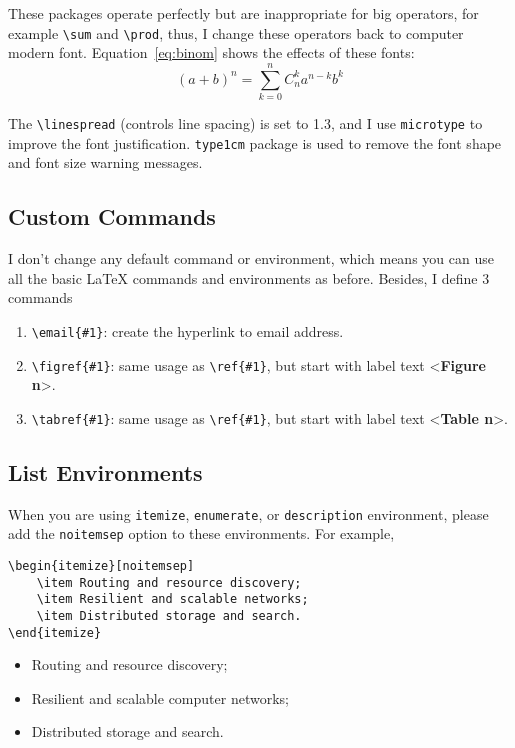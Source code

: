 \documentclass{elegantpaper}
\begin{document}
These packages operate perfectly but are inappropriate for big operators, for example \verb|\sum| and \verb|\prod|, thus, I change these operators back to computer modern font. Equation~\eqref{eq:binom} shows the effects of these fonts:
\begin{equation}
(a+b)^{n} = \sum_{k=0}^{n} C_{n}^{k} a^{n-k} b^k \label{eq:binom}
\end{equation}



The \verb|\linespread| (controls line spacing) is set to 1.3, and I use \verb|microtype| to improve the font justification. \verb|type1cm| package is used to remove the font shape and font size warning messages.

\subsection{Custom Commands}

I don't change any default command or environment, which means you can use all the basic \LaTeX{} commands and environments as before.  Besides, I define 3 commands
\begin{enumerate}[noitemsep]
	\item \verb|\email{#1}|: create the hyperlink to email address.
	\item \verb|\figref{#1}|: same usage as \verb|\ref{#1}|, but start with label text <\textbf{Figure n}>.
	\item \verb|\tabref{#1}|: same usage as \verb|\ref{#1}|, but start with label text <\textbf{Table n}>.
\end{enumerate}{}

\subsection{List Environments}
When you are using \verb|itemize|, \verb|enumerate|, or \verb|description| environment, please add the \verb|noitemsep| option to these environments. For example, \\

\begin{minipage}[c]{0.45\linewidth}
\begin{Verbatim}[tabsize=4,frame=single,baselinestretch=1]
\begin{itemize}[noitemsep]
	\item Routing and resource discovery;
	\item Resilient and scalable networks;
	\item Distributed storage and search.
\end{itemize}
\end{Verbatim}
\end{minipage}
\begin{minipage}[c]{0.45\linewidth}
\begin{itemize}[noitemsep]
	\item Routing and resource discovery;
	\item Resilient and scalable computer networks;
	\item Distributed storage and search.
\end{itemize}
\end{minipage}
\end{document}
